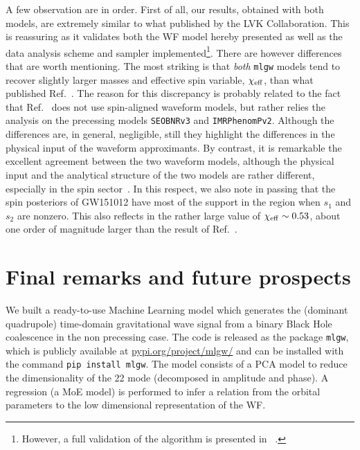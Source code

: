 A few observation are in order. First of all, our results, obtained with both models,
are extremely similar to what published by the LVK Collaboration. 
This is reassuring as it validates both the WF model hereby presented 
as well as the data analysis scheme and sampler 
implemented\footnote{However, a full validation of the algorithm is presented in ~\cite{gwmodel}.}.
There are however differences that are worth mentioning. The most striking is that
{\it both} \texttt{mlgw} models tend to recover slightly larger masses and effective 
spin variable, $\chi_{\rm eff}$, than what published Ref.~\cite{LIGOScientific:2018mvr}.
The reason for this discrepancy is probably related to the fact that Ref.~\cite{LIGOScientific:2018mvr}
does not use spin-aligned waveform models, but rather relies the analysis on 
the precessing models \texttt{SEOBNRv3} and \texttt{IMRPhenomPv2}. Although the differences 
are, in general, negligible, still they highlight the differences in the physical input of 
the waveform approximants. By contrast, it is remarkable the excellent agreement between the
two waveform models, although the physical input and the analytical structure of the
two models are rather different, especially in the spin sector~\cite{Rettegno:2019tzh}.
In this respect, we also note in passing that the spin posteriors of GW151012 have
most of the support in the region when $s_1$ and $s_2$ are nonzero. This also
reflects in the rather large value of $\chi_{\rm eff}\sim 0.53$, about one order of magnitude
larger than the result of Ref.~\cite{LIGOScientific:2018mvr}.

\section{Final remarks and future prospects}
\label{sec:end}
We built a ready-to-use Machine Learning model which generates the (dominant quadrupole) time-domain gravitational wave 
signal from a binary Black Hole coalescence in the non precessing case. The code is released as the package \texttt{mlgw}, which is publicly available at 
\href{https://pypi.org/project/mlgw/}{pypi.org/project/mlgw/} and can be installed with the command \texttt{pip install mlgw}.
The model consists of a PCA model to reduce the dimensionality of the 22 mode (decomposed in amplitude and phase). 
A regression (a MoE model) is performed to infer a relation from the orbital parameters to the low dimensional representation of the WF.

